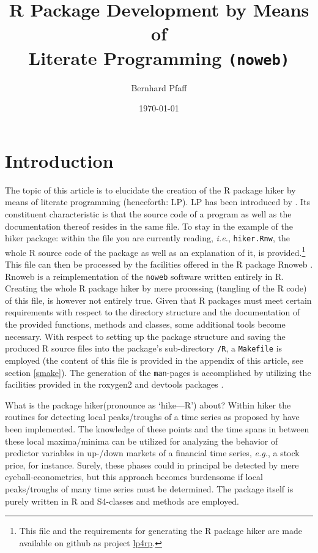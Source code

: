 \documentclass[a4paper]{article}
\newcommand{\pkg}[1]{{\fontseries{b}\selectfont #1}}
\begin{document}
\title{R Package Development by Means of \\
  Literate Programming \texttt{(noweb)}}
\author{Bernhard Pfaff}
\date{\today}

\maketitle

\section{Introduction}
\label{S1}

The topic of this article is to elucidate the creation of the R
package \pkg{hiker} by means of literate programming (henceforth:
LP). LP has been introduced by \citet{KNU1984}. Its constituent
characteristic is that the source code of a program as well as the
documentation thereof resides in the same file. To stay in the example
of the \pkg{hiker} package: within the file you are currently reading,
\emph{i.e.}, \texttt{hiker.Rnw}, the whole R source code of the
package as well as an explanation of it, is provided.\footnote{This
  file and the requirements for generating the R package \pkg{hiker}
  are made available on github as
  project \href{https://github.com/bpfaff/lp4rp}{lp4rp}.}
This file can then be processed by the facilities offered in the R package
\pkg{Rnoweb} \citep[see][]{IHA2013}. \pkg{Rnoweb} is a
reimplementation of the \texttt{noweb} software \citep[see][]{RAM1994}
written entirely in R. Creating the whole R package \pkg{hiker} by
mere processing (tangling of the R code) of this file, is however not
entirely true. Given that R packages must meet certain requirements
with respect to the directory structure and the documentation of the
provided functions, methods and classes, some additional tools become
necessary. With respect to setting up the package structure and
saving the produced R source files into the package's sub-directory
\texttt{/R}, a \texttt{Makefile} is employed (the content of this file
is provided in the appendix of this article, see section
\ref{smake}). The generation of the \texttt{man}-pages is accomplished
by utilizing the facilities provided in the \pkg{roxygen2} and
\pkg{devtools} packages \citep[see][respectively]{WIC2015,WIC2016}.\par

What is the package \pkg{hiker}(pronounce as `hike---R') about? Within
\pkg{hiker} the routines for detecting local peaks/troughs of a time
series as proposed by \citet{PAL2009} have been implemented. The
knowledge of these points and the time spans in between these local
maxima/minima can be utilized for analyzing the behavior of predictor
variables in up-/down markets of a financial time series, \emph{e.g.},
a stock price, for instance. Surely, these phases could in principal
be detected by mere eyeball-econometrics, but this approach becomes
burdensome if local peaks/troughs of many time series must be
determined. The package itself is purely written in R and S4-classes
and methods are employed.\par
\end{document}
